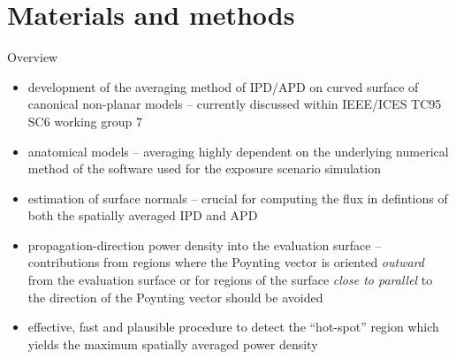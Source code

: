 \documentclass[xcolor=dvipsnames,10pt]{beamer}
\begin{document}
\section[Materials and methods]{Materials and methods}

\begin{frame}{Overview}
    \begin{itemize}
        \item development of the averaging method of IPD/APD on curved surface of canonical non-planar models -- currently discussed within IEEE/ICES TC95 SC6 working group 7
        \item anatomical models -- averaging highly dependent on the underlying numerical method of the software used for the exposure scenario simulation
        \item estimation of surface normals -- crucial for computing the flux in defintions of both the spatially averaged IPD and APD
        \item propagation-direction power density into the evaluation surface -- contributions from regions where the Poynting vector is oriented \emph{outward} from the evaluation surface or for regions of the surface \emph{close to parallel} to the direction of the Poynting vector should be avoided
        \item effective, fast and plausible procedure to detect the ``hot-spot'' region which yields the maximum spatially averaged power density
    \end{itemize}
\end{frame}
\end{document}
